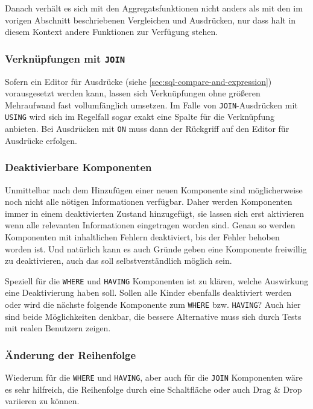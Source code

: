 Danach verhält es sich mit den Aggregatsfunktionen nicht anders als mit den im vorigen Abschnitt beschriebenen Vergleichen und Ausdrücken, nur dass halt in diesem Kontext andere Funktionen zur Verfügung stehen.

\subsubsection{Verknüpfungen mit \texttt{JOIN}}

Sofern ein Editor für Ausdrücke (siehe \ref{sec:sql-compare-and-expression}) vorausgesetzt werden kann, lassen sich Verknüpfungen ohne größeren Mehraufwand fast vollumfänglich umsetzen. Im Falle von \texttt{JOIN}-Ausdrücken mit \texttt{USING} wird sich im Regelfall sogar exakt eine Spalte für die Verknüpfung anbieten. Bei Ausdrücken mit \texttt{ON} muss dann der Rückgriff auf den Editor für Ausdrücke erfolgen.

\subsubsection{Deaktivierbare Komponenten}

Unmittelbar nach dem Hinzufügen einer neuen Komponente sind möglicherweise noch nicht alle nötigen Informationen verfügbar. Daher werden Komponenten immer in einem deaktivierten Zustand hinzugefügt, sie lassen sich erst aktivieren wenn alle relevanten Informationen eingetragen worden sind. Genau so werden Komponenten mit inhaltlichen Fehlern deaktiviert, bis der Fehler behoben worden ist. Und natürlich kann es auch Gründe geben eine Komponente freiwillig zu deaktivieren, auch das soll selbstverständlich möglich sein.

Speziell für die \texttt{WHERE} und \texttt{HAVING} Komponenten ist zu klären, welche Auswirkung eine Deaktivierung haben soll. Sollen alle Kinder ebenfalls deaktiviert werden oder wird die nächste folgende Komponente zum \texttt{WHERE} bzw. \texttt{HAVING}? Auch hier sind beide Möglichkeiten denkbar, die bessere Alternative muss sich durch Tests mit realen Benutzern zeigen.

\subsubsection{Änderung der Reihenfolge}

Wiederum für die \texttt{WHERE} und \texttt{HAVING}, aber auch für die \texttt{JOIN} Komponenten wäre es sehr hilfreich, die Reihenfolge durch eine Schaltfläche oder auch Drag \& Drop variieren zu können.

